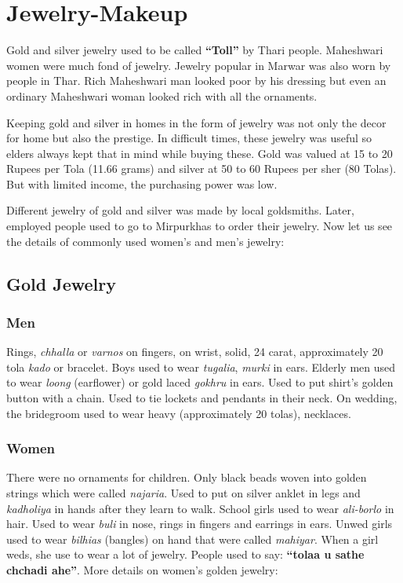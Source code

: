 \section{Jewelry-Makeup} Gold and silver jewelry used to be called
\textbf{``Toll''} by Thari people. Maheshwari women were much fond of
jewelry. Jewelry popular in Marwar was also worn by people in Thar. Rich
Maheshwari man looked poor by his dressing but even an ordinary Maheshwari woman
looked rich with all the ornaments.

Keeping gold and silver in homes in the form of jewelry was not only the decor
for home but also the prestige. In difficult times, these jewelry was useful so
elders always kept that in mind while buying these. Gold was valued at 15 to
20 Rupees per Tola (11.66 grams) and silver at 50 to 60 Rupees per sher (80
Tolas). But with limited income, the purchasing power was low.

Different jewelry of gold and silver was made by local goldsmiths. Later,
employed people used to go to Mirpurkhas to order their jewelry. Now let us see
the details of commonly used women's and men's jewelry:
\subsection{Gold Jewelry}

\subsubsection*{Men} Rings, \textit{chhalla} or \textit{varnos} on fingers, on
wrist, solid, 24 carat, approximately 20 tola \textit{kado} or bracelet. Boys
used to wear \textit{tugalia}, \textit{murki} in ears. Elderly men used to wear
\textit{loong} (earflower) or gold laced \textit{gokhru} in ears. Used to put
shirt's golden button with a chain. Used to tie lockets and pendants in their
neck. On wedding, the bridegroom used to wear heavy (approximately 20 tolas),
necklaces.
\subsubsection*{Women} There were no ornaments for children. Only black beads
woven into golden strings which were called \textit{najaria}. Used to put on
silver anklet in legs and \textit{kadholiya} in hands after they learn to walk.
School girls used to wear \textit{ali-borlo} in hair. Used to wear \textit{buli}
in nose, rings in fingers and earrings in ears. Unwed girls used to wear
\textit{bilhias} (bangles) on hand that were called \textit{mahiyar}. When a
girl weds, she use to wear a lot of jewelry. People used to say: \textbf{``tolaa
u sathe chchadi ahe''}. More details on women's golden jewelry:

